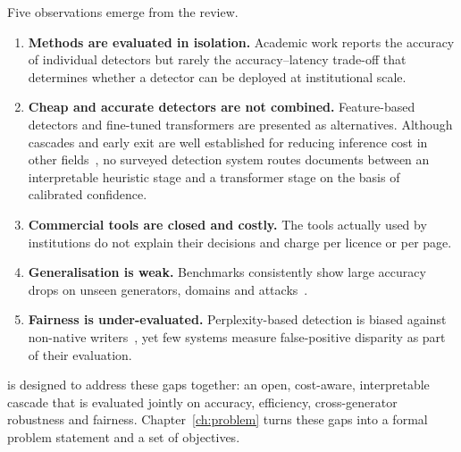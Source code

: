 Five observations emerge from the review.
\begin{enumerate}
  \item \textbf{Methods are evaluated in isolation.} Academic work reports the
        accuracy of individual detectors but rarely the accuracy--latency
        trade-off that determines whether a detector can be deployed at
        institutional scale.
  \item \textbf{Cheap and accurate detectors are not combined.} Feature-based
        detectors and fine-tuned transformers are presented as alternatives.
        Although cascades and early exit are well established for reducing
        inference cost in other fields~\cite{viola2001rapid,xin2020deebert,
        chen2023frugalgpt}, no surveyed detection system routes documents
        between an interpretable heuristic stage and a transformer stage on the
        basis of calibrated confidence.
  \item \textbf{Commercial tools are closed and costly.} The tools actually
        used by institutions do not explain their decisions and charge per
        licence or per page.
  \item \textbf{Generalisation is weak.} Benchmarks consistently show large
        accuracy drops on unseen generators, domains and attacks~\cite{wang2024m4,
        li2024mage,dugan2024raid,krishna2023paraphrasing}.
  \item \textbf{Fairness is under-evaluated.} Perplexity-based detection is
        biased against non-native writers~\cite{liang2023biased}, yet few
        systems measure false-positive disparity as part of their evaluation.
\end{enumerate}

\veriscript{} is designed to address these gaps together: an open,
cost-aware, interpretable cascade that is evaluated jointly on accuracy,
efficiency, cross-generator robustness and fairness. Chapter~\ref{ch:problem}
turns these gaps into a formal problem statement and a set of objectives.
